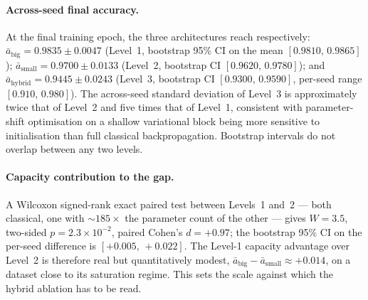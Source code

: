 \paragraph{Across-seed final accuracy.}
At the final training epoch, the three architectures reach respectively:
$\bar{a}_{\mathrm{big}}=0.9835\pm 0.0047$ (Level~1, bootstrap 95\% CI on
the mean $[0.9810,\,0.9865]$); $\bar{a}_{\mathrm{small}}=0.9700\pm
0.0133$ (Level~2, bootstrap CI $[0.9620,\,0.9780]$); and
$\bar{a}_{\mathrm{hybrid}}=0.9445\pm 0.0243$ (Level~3, bootstrap CI
$[0.9300,\,0.9590]$, per-seed range $[0.910,\,0.980]$). The
across-seed standard deviation of Level~3 is approximately twice that
of Level~2 and five times that of Level~1, consistent with parameter-shift
optimisation on a shallow variational block being more sensitive to
initialisation than full classical backpropagation. Bootstrap intervals
do not overlap between any two levels.

\paragraph{Capacity contribution to the gap.}
A Wilcoxon signed-rank exact paired test between Levels~1 and~2 — both
classical, one with $\sim$$185\times$ the parameter count of the other —
gives $W=3.5$, two-sided $p=2.3\times 10^{-2}$, paired Cohen's
$d=+0.97$; the bootstrap 95\% CI on the per-seed difference is
$[+0.005,\,+0.022]$. The Level-1 capacity advantage over Level~2 is
therefore real but quantitatively modest, $\bar{a}_{\mathrm{big}} -
\bar{a}_{\mathrm{small}} \approx +0.014$, on a dataset close to its
saturation regime. This sets the scale against which the hybrid
ablation has to be read.

